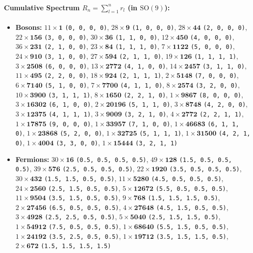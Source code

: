 \documentclass[11pt,a4paper]{article}
\begin{document}
\paragraph{Cumulative Spectrum $R_n = \sum_{l=1}^n r_l$ (in $\mathrm{SO}(9)$):}
\begin{itemize}
    \item \textbf{Bosons:} $11 \times \mathbf{1}$ \texttt{(0, 0, 0, 0)}, $28 \times \mathbf{9}$ \texttt{(1, 0, 0, 0)}, $28 \times \mathbf{44}$ \texttt{(2, 0, 0, 0)}, $22 \times \mathbf{156}$ \texttt{(3, 0, 0, 0)}, $30 \times \mathbf{36}$ \texttt{(1, 1, 0, 0)}, $12 \times \mathbf{450}$ \texttt{(4, 0, 0, 0)}, $36 \times \mathbf{231}$ \texttt{(2, 1, 0, 0)}, $23 \times \mathbf{84}$ \texttt{(1, 1, 1, 0)}, $7 \times \mathbf{1122}$ \texttt{(5, 0, 0, 0)}, $24 \times \mathbf{910}$ \texttt{(3, 1, 0, 0)}, $27 \times \mathbf{594}$ \texttt{(2, 1, 1, 0)}, $19 \times \mathbf{126}$ \texttt{(1, 1, 1, 1)}, $3 \times \mathbf{2508}$ \texttt{(6, 0, 0, 0)}, $13 \times \mathbf{2772}$ \texttt{(4, 1, 0, 0)}, $14 \times \mathbf{2457}$ \texttt{(3, 1, 1, 0)}, $11 \times \mathbf{495}$ \texttt{(2, 2, 0, 0)}, $18 \times \mathbf{924}$ \texttt{(2, 1, 1, 1)}, $2 \times \mathbf{5148}$ \texttt{(7, 0, 0, 0)}, $6 \times \mathbf{7140}$ \texttt{(5, 1, 0, 0)}, $7 \times \mathbf{7700}$ \texttt{(4, 1, 1, 0)}, $8 \times \mathbf{2574}$ \texttt{(3, 2, 0, 0)}, $10 \times \mathbf{3900}$ \texttt{(3, 1, 1, 1)}, $8 \times \mathbf{1650}$ \texttt{(2, 2, 1, 0)}, $1 \times \mathbf{9867}$ \texttt{(8, 0, 0, 0)}, $3 \times \mathbf{16302}$ \texttt{(6, 1, 0, 0)}, $2 \times \mathbf{20196}$ \texttt{(5, 1, 1, 0)}, $3 \times \mathbf{8748}$ \texttt{(4, 2, 0, 0)}, $3 \times \mathbf{12375}$ \texttt{(4, 1, 1, 1)}, $3 \times \mathbf{9009}$ \texttt{(3, 2, 1, 0)}, $4 \times \mathbf{2772}$ \texttt{(2, 2, 1, 1)}, $1 \times \mathbf{17875}$ \texttt{(9, 0, 0, 0)}, $1 \times \mathbf{33957}$ \texttt{(7, 1, 0, 0)}, $1 \times \mathbf{46683}$ \texttt{(6, 1, 1, 0)}, $1 \times \mathbf{23868}$ \texttt{(5, 2, 0, 0)}, $1 \times \mathbf{32725}$ \texttt{(5, 1, 1, 1)}, $1 \times \mathbf{31500}$ \texttt{(4, 2, 1, 0)}, $1 \times \mathbf{4004}$ \texttt{(3, 3, 0, 0)}, $1 \times \mathbf{15444}$ \texttt{(3, 2, 1, 1)}
    \item \textbf{Fermions:} $30 \times \mathbf{16}$ \texttt{(0.5, 0.5, 0.5, 0.5)}, $49 \times \mathbf{128}$ \texttt{(1.5, 0.5, 0.5, 0.5)}, $39 \times \mathbf{576}$ \texttt{(2.5, 0.5, 0.5, 0.5)}, $22 \times \mathbf{1920}$ \texttt{(3.5, 0.5, 0.5, 0.5)}, $30 \times \mathbf{432}$ \texttt{(1.5, 1.5, 0.5, 0.5)}, $11 \times \mathbf{5280}$ \texttt{(4.5, 0.5, 0.5, 0.5)}, $24 \times \mathbf{2560}$ \texttt{(2.5, 1.5, 0.5, 0.5)}, $5 \times \mathbf{12672}$ \texttt{(5.5, 0.5, 0.5, 0.5)}, $11 \times \mathbf{9504}$ \texttt{(3.5, 1.5, 0.5, 0.5)}, $9 \times \mathbf{768}$ \texttt{(1.5, 1.5, 1.5, 0.5)}, $2 \times \mathbf{27456}$ \texttt{(6.5, 0.5, 0.5, 0.5)}, $4 \times \mathbf{27648}$ \texttt{(4.5, 1.5, 0.5, 0.5)}, $3 \times \mathbf{4928}$ \texttt{(2.5, 2.5, 0.5, 0.5)}, $5 \times \mathbf{5040}$ \texttt{(2.5, 1.5, 1.5, 0.5)}, $1 \times \mathbf{54912}$ \texttt{(7.5, 0.5, 0.5, 0.5)}, $1 \times \mathbf{68640}$ \texttt{(5.5, 1.5, 0.5, 0.5)}, $1 \times \mathbf{24192}$ \texttt{(3.5, 2.5, 0.5, 0.5)}, $1 \times \mathbf{19712}$ \texttt{(3.5, 1.5, 1.5, 0.5)}, $2 \times \mathbf{672}$ \texttt{(1.5, 1.5, 1.5, 1.5)}
\end{itemize}
\end{document}

